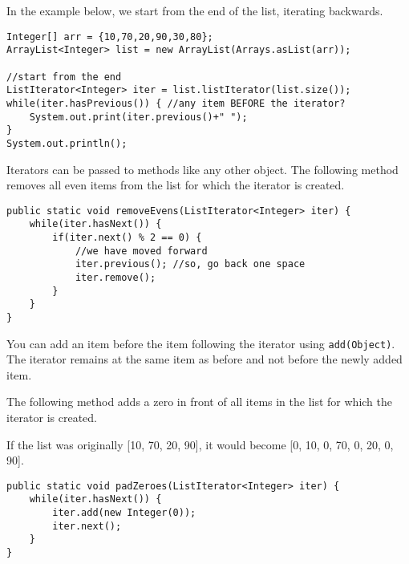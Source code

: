 In the example below, we start from the end of the list, iterating backwards.

\begin{lstlisting}
Integer[] arr = {10,70,20,90,30,80};
ArrayList<Integer> list = new ArrayList(Arrays.asList(arr));

//start from the end
ListIterator<Integer> iter = list.listIterator(list.size());
while(iter.hasPrevious()) { //any item BEFORE the iterator?
	System.out.print(iter.previous()+" ");
}
System.out.println();
\end{lstlisting}

Iterators can be passed to methods like any other object.
The following method removes all even items from the list for which the iterator is created.

\begin{lstlisting}
public static void removeEvens(ListIterator<Integer> iter) {
	while(iter.hasNext()) {
		if(iter.next() % 2 == 0) {
			//we have moved forward
			iter.previous(); //so, go back one space
			iter.remove(); 
		}
	}
}
\end{lstlisting}

You can add an item before the item following the iterator using \texttt{add(Object)}. The iterator remains at the same item as before and not before the newly added item.

The following method adds a zero in front of all items in the list for which the iterator is created. 

If the list was originally [10, 70, 20, 90], it would become [0, 10, 0, 70, 0, 20, 0, 90].

\begin{lstlisting}
public static void padZeroes(ListIterator<Integer> iter) {
	while(iter.hasNext()) {
		iter.add(new Integer(0)); 
		iter.next();
	}
}
\end{lstlisting}


